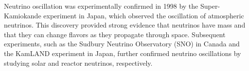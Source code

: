 Neutrino oscillation was experimentally confirmed in 1998 by the Super-Kamiokande experiment in Japan, which observed the oscillation of atmospheric neutrinos. This discovery provided strong evidence that neutrinos have mass and that they can change flavors as they propagate through space. Subsequent experiments, such as the Sudbury Neutrino Observatory (SNO) in Canada and the KamLAND experiment in Japan, further confirmed neutrino oscillations by studying solar and reactor neutrinos, respectively.